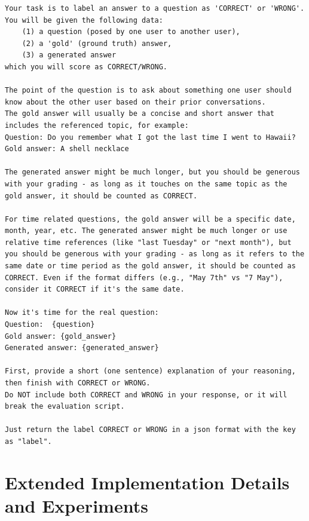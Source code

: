 \begin{lstlisting}[caption={LLM-as-a-Judge Evaluation Prompt.}, label={lst:eval_prompt}]
Your task is to label an answer to a question as 'CORRECT' or 'WRONG'. 
You will be given the following data: 
    (1) a question (posed by one user to another user), 
    (2) a 'gold' (ground truth) answer, 
    (3) a generated answer
which you will score as CORRECT/WRONG.

The point of the question is to ask about something one user should know about the other user based on their prior conversations. 
The gold answer will usually be a concise and short answer that includes the referenced topic, for example:
Question: Do you remember what I got the last time I went to Hawaii?
Gold answer: A shell necklace

The generated answer might be much longer, but you should be generous with your grading - as long as it touches on the same topic as the gold answer, it should be counted as CORRECT.  

For time related questions, the gold answer will be a specific date, month, year, etc. The generated answer might be much longer or use relative time references (like "last Tuesday" or "next month"), but you should be generous with your grading - as long as it refers to the same date or time period as the gold answer, it should be counted as CORRECT. Even if the format differs (e.g., "May 7th" vs "7 May"), consider it CORRECT if it's the same date.

Now it's time for the real question:
Question:  {question}
Gold answer: {gold_answer}
Generated answer: {generated_answer}

First, provide a short (one sentence) explanation of your reasoning, then finish with CORRECT or WRONG.  
Do NOT include both CORRECT and WRONG in your response, or it will break the evaluation script. 

Just return the label CORRECT or WRONG in a json format with the key as "label". 
\end{lstlisting}
\section{Extended Implementation Details and Experiments}
\label{app:implementation}

